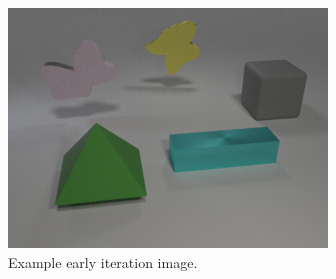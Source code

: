 \begin{figure}
\vspace{-.4in}
\begin{spacing}{1.0}
\centering
\includegraphics[width=.95\linewidth]{ch-dataset-task-benchmark/figures/dataset/first_iteration_image.png}
\caption{Example early iteration image.}
\label{fig:dataset-early-image}
\end{spacing}
\end{figure}

